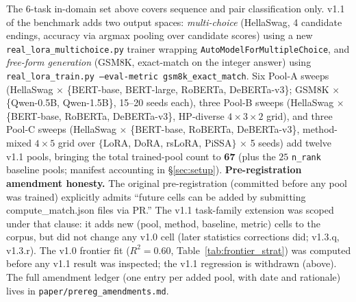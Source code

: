 \documentclass[11pt]{article}
\begin{document}
The 6-task in-domain set above covers sequence and pair classification only. v1.1 of the benchmark adds two output spaces: \emph{multi-choice} (HellaSwag, 4 candidate endings, accuracy via argmax pooling over candidate scores) using a new \texttt{real\_\allowbreak lora\_\allowbreak multichoice.\allowbreak py} trainer wrapping \texttt{AutoModelForMultipleChoice}, and \emph{free-form generation} (GSM8K, exact-match on the integer answer) using \texttt{real\_\allowbreak lora\_\allowbreak train.\allowbreak py --eval-metric gsm8k\_\allowbreak exact\_\allowbreak match}. Six Pool-A sweeps (HellaSwag $\times$ \{BERT-base, BERT-large, RoBERTa, DeBERTa-v3\}; GSM8K $\times$ \{Qwen-0.5B, Qwen-1.5B\}, 15--20 seeds each), three Pool-B sweeps (HellaSwag $\times$ \{BERT-base, RoBERTa, DeBERTa-v3\}, HP-diverse $4{\times}3{\times}2$ grid), and three Pool-C sweeps (HellaSwag $\times$ \{BERT-base, RoBERTa, DeBERTa-v3\}, method-mixed $4{\times}5$ grid over $\{$LoRA, DoRA, rsLoRA, PiSSA$\}$ $\times$ 5 seeds) add twelve v1.1 pools, bringing the total trained-pool count to \textbf{67} (plus the $25$ \texttt{n\_rank} baseline pools; manifest accounting in \S\ref{sec:setup}). \textbf{Pre-registration amendment honesty.} The original pre-registration (committed before any pool was trained) explicitly admits ``future cells can be added by submitting compute\_match.json files via PR.'' The v1.1 task-family extension was scoped under that clause: it adds new (pool, method, baseline, metric) cells to the corpus, but did not change any v1.0 cell (later statistics corrections did; v1.3.q, v1.3.r). The v1.0 frontier fit ($R^2{=}0.60$, Table~\ref{tab:frontier_strat}) was computed before any v1.1 result was inspected; the v1.1 regression is withdrawn (above). The full amendment ledger (one entry per added pool, with date and rationale) lives in \texttt{paper/\allowbreak prereg\_\allowbreak amendments.\allowbreak md}.
\end{document}
